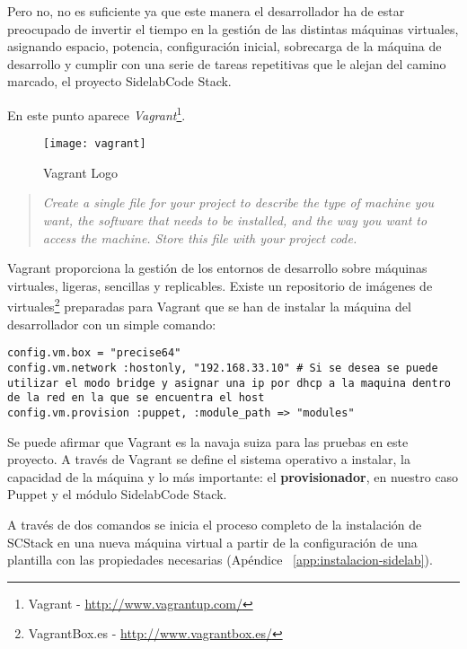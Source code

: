 \par Pero no, no es suficiente ya que este manera el desarrollador ha de estar preocupado de invertir el tiempo en la gestión de las distintas máquinas virtuales, asignando espacio, potencia, configuración inicial, sobrecarga de la máquina de desarrollo y cumplir con una serie de tareas repetitivas que le alejan del camino marcado, el proyecto SidelabCode Stack.

\par En este punto aparece \emph{Vagrant}\footnote{Vagrant - \url{http://www.vagrantup.com/}}.

\begin{figure}[H]
    \centering
    \texttt{[image: vagrant]}
    \caption{Vagrant Logo}
    \label{fir:vagrant}
\end{figure}

\begin{quote}
    \emph{Create a single file for your project to describe the type of machine you want, the software that needs to be installed, and the way you want to access the machine. Store this file with your project code.}
\end{quote}

\par Vagrant proporciona la gestión de los entornos de desarrollo sobre máquinas virtuales, ligeras, sencillas y replicables. Existe un repositorio de imágenes de virtuales\footnote{VagrantBox.es - \url{http://www.vagrantbox.es/}} preparadas para Vagrant que se han de instalar la máquina del desarrollador con un simple comando:

\lstset{style=bashbasico}
\begin{lstlisting}[frame=trbl]
config.vm.box = "precise64"
config.vm.network :hostonly, "192.168.33.10" # Si se desea se puede utilizar el modo bridge y asignar una ip por dhcp a la maquina dentro de la red en la que se encuentra el host
config.vm.provision :puppet, :module_path => "modules"
\end{lstlisting}

\par Se puede afirmar que Vagrant es la navaja suiza para las pruebas en este proyecto. A través de Vagrant se define el sistema operativo a instalar, la capacidad de la máquina y lo más importante: el \textbf{provisionador}, en nuestro caso Puppet y el módulo SidelabCode Stack.

\par A través de dos comandos se inicia el proceso completo de la instalación de SCStack en una nueva máquina virtual a partir de la configuración de una plantilla con las propiedades necesarias (Apéndice ~\ref{app:instalacion-sidelab}).

